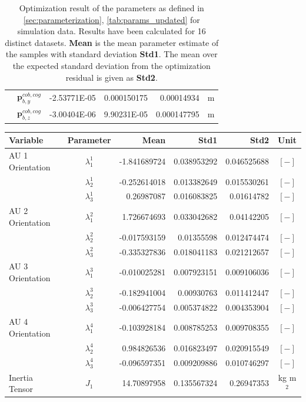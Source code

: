\begin{table}[H]
\begin{tabular}{lcrrrc}
                  & $\mathbf{p}_{b,y}^{cob,cog}$ & -2.53771E-05 & 0.000150175 & 0.00014934 & m \\
                  & $\mathbf{p}_{b,z}^{cob,cog}$ & -3.00404E-06 & 9.90231E-05 & 0.000147795 & m \\
\hline
\end{tabular}
\caption{Optimization result of the parameters as defined in \cref{sec:parameterization}, \cref{tab:params_updated} for simulation data. Results have been calculated for 16 distinct datasets. \textbf{Mean} is the mean parameter estimate of the samples with standard deviation \textbf{Std1}. The mean over the expected standard deviation from the optimization residual is given as \textbf{Std2}.}
\end{table}

\begin{table}[H]
\begin{tabular}{lcrrrc}
Variable & Parameter & Mean & Std1 & Std2 & Unit \\
\hline \hline
AU 1 Orientation & $\lambda_1^1$ & -1.841689724 & 0.038953292 & 0.046525688 & $[-]$ \\
                 & $\lambda_2^1$ & -0.252614018 & 0.013382649 & 0.015530261 & $[-]$ \\
                 & $\lambda_3^1$ &  0.26987087 & 0.016083825 & 0.01614782 & $[-]$ \\
AU 2 Orientation & $\lambda_1^2$ &  1.726674693 & 0.033042682 & 0.04142205 & $[-]$ \\
                 & $\lambda_2^2$ & -0.017593159 & 0.01355598 & 0.012474474 & $[-]$ \\
                 & $\lambda_3^2$ & -0.335327836 & 0.018041183 & 0.021212657 & $[-]$ \\
AU 3 Orientation & $\lambda_1^3$ & -0.010025281 & 0.007923151 & 0.009106036 & $[-]$ \\
                 & $\lambda_2^3$ & -0.182941004 & 0.00930763 & 0.011412447 & $[-]$ \\
                 & $\lambda_3^3$ & -0.006427754 & 0.005374822 & 0.004353904 & $[-]$ \\
AU 4 Orientation & $\lambda_1^4$ & -0.103928184 & 0.008785253 & 0.009708355 & $[-]$ \\
                 & $\lambda_2^4$ &  0.984826536 & 0.016823497 & 0.020915549 & $[-]$ \\
                 & $\lambda_3^4$ & -0.096597351 & 0.009209886 & 0.010746297 & $[-]$ \\
\hline
Inertia Tensor & $J_1$ & 14.70897958 & 0.135567324 & 0.26947353 & kg m$^2$ \\

\end{tabular}
\end{table}
